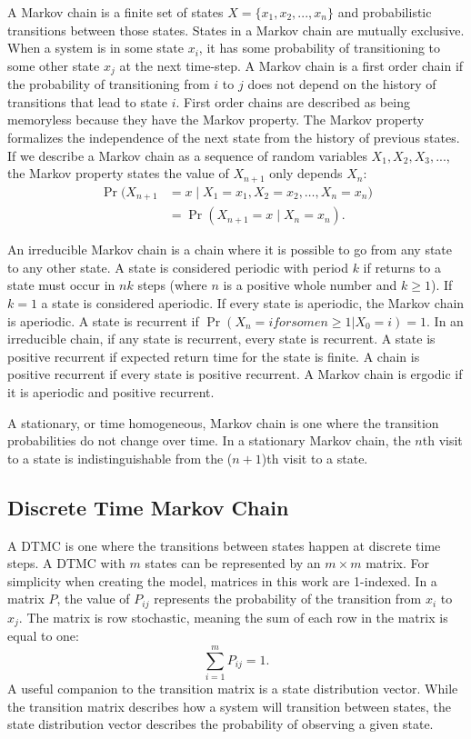 %
A Markov chain is a finite set of states $X=\{x_1, x_2, ..., x_n\}$ and probabilistic transitions between those states.
States in a Markov chain are mutually exclusive.
When a system is in some state $x_i$, it has some probability of transitioning to some other state $x_j$ at the next time-step.
A Markov chain is a first order chain if the probability of transitioning from $i$ to $j$ does not depend on the history of transitions that lead to state $i$.
First order chains are described as being memoryless because they have the Markov property.
The Markov property formalizes the independence of the next state from the history of previous states.
If we describe a Markov chain as a sequence of random variables $X_{1}, X_{2}, X_{3}, ...$, the Markov property states the value of $X_{n+1}$ only depends $X_{n}$: \cite{MARKOV3}
\begin{align} \Pr(X_{n+1}&=x\mid X_1=x_1, X_2=x_2, \ldots, X_n=x_n)
\nonumber \\ &= \Pr(X_{n+1}=x\mid X_n=x_n). \end{align}

An irreducible Markov chain is a chain where it is possible to go from any state to any other state.
A state is considered periodic with period $k$ if returns to a state must occur in $nk$ steps (where $n$ is a positive whole number and $k \geq 1$).
If $k=1$ a state is considered aperiodic.
If every state is aperiodic, the Markov chain is aperiodic.
A state is recurrent if $\Pr(X_n=i for some n \geq 1| X_0=i)=1$.
In an irreducible chain, if any state is recurrent, every state is recurrent.
A state is positive recurrent if expected return time for the state is finite.
A chain is positive recurrent if every state is positive recurrent.
A Markov chain is ergodic if it is aperiodic and positive recurrent.

A stationary, or time homogeneous, Markov chain is one where the transition probabilities do not change over time.
In a stationary Markov chain, the $n$th visit to a state is indistinguishable from the ($n+1$)th visit to a state.

\subsection{Discrete Time Markov Chain}

A \ac{DTMC} is one where the transitions between states happen at discrete time steps.
A \ac{DTMC} with $m$ states can be represented by an $m\times m$ matrix.
For simplicity when creating the model, matrices in this work are 1-indexed.
In a matrix $P$, the value of $P_{ij}$ represents the probability of the transition from $x_i$ to $x_j$.
The matrix is row stochastic, meaning the sum of each row in the matrix is equal to one:
\begin{equation} \sum_{i=1}^{m} P_{ij} = 1. \end{equation}
A useful companion to the transition matrix is a state distribution vector.
While the transition matrix describes how a system will transition between states, the state distribution vector describes the probability of observing a given state.

